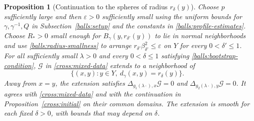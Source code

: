 \documentclass[11pt,a4paper]{article}
\newtheorem{proposition}[theorem]{Proposition}
\theoremstyle{definition}
\theoremstyle{remark}
\numberwithin{equation}{section}
\begin{document}
\begin{proposition}[Continuation to the spheres of radius $r_\delta(y)$]\label{balls:continuation}
Choose $p$ sufficiently large and then $\varepsilon>0$ sufficiently small
using the uniform bounds for $\gamma,\gamma^{-1},Q$ in
Subsection~\ref{balls:setup} and the constants in
\eqref{balls:profile-estimates}. Choose $R_*>0$ small enough for
$B_\gamma(y,r_{\delta'}(y))$ to lie in normal neighborhoods and use
\eqref{balls:radius-smallness} to arrange
$r_{\delta'}\beta_{\delta'}^2\leq\varepsilon$ on $Y$ for every
$0<\delta'\leq1$.
For all sufficiently small $\lambda>0$ and every $0<\delta\le1$
satisfying \eqref{balls:bootstrap-condition}, $\mathcal G$ in
\eqref{cross:mixed-data} extends to a neighborhood of
\[
 \{(x,y):y\in Y,\ d_\gamma(x,y)=r_\delta(y)\}.
\]
Away from $x=y$, the extension satisfies
$\Delta_{g_1(\lambda\cdot),x}\mathcal G=0$ and
$\Delta_{g_2(\lambda\cdot),y}\mathcal G=0$.
It agrees with \eqref{cross:mixed-data} and with the continuation in
Proposition~\ref{cross:initial} on their common domains. The extension
is smooth for each fixed $\delta>0$, with bounds that may depend on
$\delta$.
\end{proposition}
\end{document}
